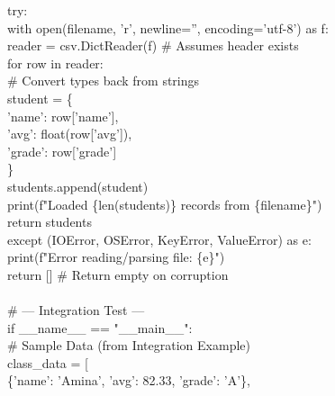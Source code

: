 \documentclass[11pt]{article}
\begin{document}
\begin{exoresolu}
\begin{flushleft}
\hspace{1em}try:\\
\hspace{2em}with open(filename, 'r', newline='', encoding='utf-8') as f:\\
\hspace{3em}reader = csv.DictReader(f) \hspace{1em}\# Assumes header exists\\
\hspace{3em}for row in reader:\\
\hspace{4em}\# Convert types back from strings\\
\hspace{4em}student = \{\\
\hspace{5em}'name': row['name'],\\
\hspace{5em}'avg': float(row['avg']),\\
\hspace{5em}'grade': row['grade']\\
\hspace{4em}\}\\
\hspace{4em}students.append(student)\\
\hspace{2em}print(f"Loaded \{len(students)\} records from \{filename\}")\\
\hspace{2em}return students\\
\hspace{1em}except (IOError, OSError, KeyError, ValueError) as e:\\
\hspace{2em}print(f"Error reading/parsing file: \{e\}")\\
\hspace{2em}return [] \hspace{1em}\# Return empty on corruption\\
\mbox{}\\
\# --- Integration Test ---\\
if \_\_name\_\_ == "\_\_main\_\_":\\
\hspace{1em}\# Sample Data (from Integration Example)\\
\hspace{1em}class\_data = [\\
\hspace{2em}\{'name': 'Amina', 'avg': 82.33, 'grade': 'A'\},\\

\end{flushleft}
\end{exoresolu}
\end{document}
